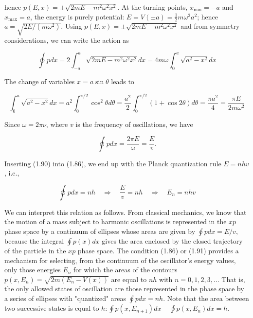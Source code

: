 \documentclass[10pt]{article}
\begin{document}
hence $p(E, x)= \pm \sqrt{2 m E-m^{2} \omega^{2} x^{2}}$. At the turning points, $x_{\min }=-a$ and $x_{\max }=a$, the energy is purely potential: $E=V( \pm a)=\frac{1}{2} m \omega^{2} a^{2}$; hence $a=\sqrt{2 E /\left(m \omega^{2}\right)}$. Using $p(E, x)= \pm \sqrt{2 m E-m^{2} \omega^{2} x^{2}}$ and from symmetry considerations, we can write the action as


\begin{equation*}
\oint p d x=2 \int_{-a}^{a} \sqrt{2 m E-m^{2} \omega^{2} x^{2}} d x=4 m \omega \int_{0}^{a} \sqrt{a^{2}-x^{2}} d x \tag{1.88}
\end{equation*}


The change of variables $x=a \sin \theta$ leads to


\begin{equation*}
\int_{0}^{a} \sqrt{a^{2}-x^{2}} d x=a^{2} \int_{0}^{\pi / 2} \cos ^{2} \theta d \theta=\frac{a^{2}}{2} \int_{0}^{\pi / 2}(1+\cos 2 \theta) d \theta=\frac{\pi a^{2}}{4}=\frac{\pi E}{2 m \omega^{2}} \tag{1.89}
\end{equation*}


Since $\omega=2 \pi \nu$, where $v$ is the frequency of oscillations, we have


\begin{equation*}
\oint p d x=\frac{2 \pi E}{\omega}=\frac{E}{v} . \tag{1.90}
\end{equation*}


Inserting (1.90) into (1.86), we end up with the Planck quantization rule $E=n h v$, i.e.,


\begin{equation*}
\oint p d x=n h \quad \Longrightarrow \quad \frac{E}{v}=n h \quad \Longrightarrow \quad E_{n}=n h v \tag{1.91}
\end{equation*}


We can interpret this relation as follows. From classical mechanics, we know that the motion of a mass subject to harmonic oscillations is represented in the $x p$ phase space by a continuum of ellipses whose areas are given by $\oint p d x=E / v$, because the integral $\oint p(x) d x$ gives the area enclosed by the closed trajectory of the particle in the $x p$ phase space. The condition (1.86) or (1.91) provides a mechanism for selecting, from the continuum of the oscillator's energy values, only those energies $E_{n}$ for which the areas of the contours $p\left(x, E_{n}\right)=\sqrt{2 m\left(E_{n}-V(x)\right)}$ are equal to $n h$ with $n=0,1,2,3, \ldots$ That is, the only allowed states of oscillation are those represented in the phase space by a series of ellipses with "quantized" areas $\oint p d x=n h$. Note that the area between two successive states is equal to $h: \oint p\left(x, E_{n+1}\right) d x-\oint p\left(x, E_{n}\right) d x=h$.
\end{document}

